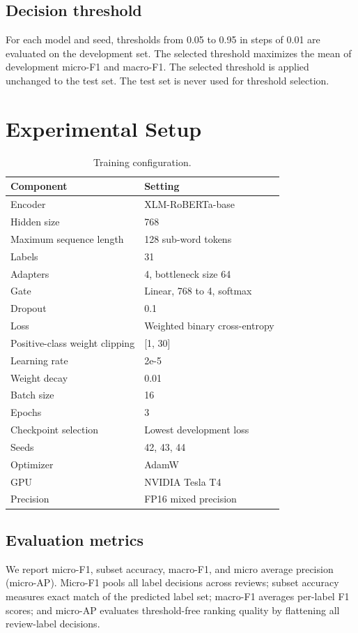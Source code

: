 \documentclass[review,12pt]{elsarticle}
\begin{document}
\subsection{Decision threshold}
For each model and seed, thresholds from 0.05 to 0.95 in steps of 0.01 are evaluated on the development set. The selected threshold maximizes the mean of development micro-F1 and macro-F1. The selected threshold is applied unchanged to the test set. The test set is never used for threshold selection.

\section{Experimental Setup}

\begin{table}[htbp]
\centering
\caption{Training configuration.}
\label{tab:training}
\begin{tabular}{ll}
\toprule
Component & Setting \\
\midrule
Encoder & XLM-RoBERTa-base \\
Hidden size & 768 \\
Maximum sequence length & 128 sub-word tokens \\
Labels & 31 \\
Adapters & 4, bottleneck size 64 \\
Gate & Linear, 768 to 4, softmax \\
Dropout & 0.1 \\
Loss & Weighted binary cross-entropy \\
Positive-class weight clipping & [1, 30] \\
Learning rate & 2e-5 \\
Weight decay & 0.01 \\
Batch size & 16 \\
Epochs & 3 \\
Checkpoint selection & Lowest development loss \\
Seeds & 42, 43, 44 \\
Optimizer & AdamW \\
GPU & NVIDIA Tesla T4 \\
Precision & FP16 mixed precision \\
\bottomrule
\end{tabular}
\end{table}

\subsection{Evaluation metrics}
We report micro-F1, subset accuracy, macro-F1, and micro average precision (micro-AP). Micro-F1 pools all label decisions across reviews; subset accuracy measures exact match of the predicted label set; macro-F1 averages per-label F1 scores; and micro-AP evaluates threshold-free ranking quality by flattening all review-label decisions.
\end{document}
